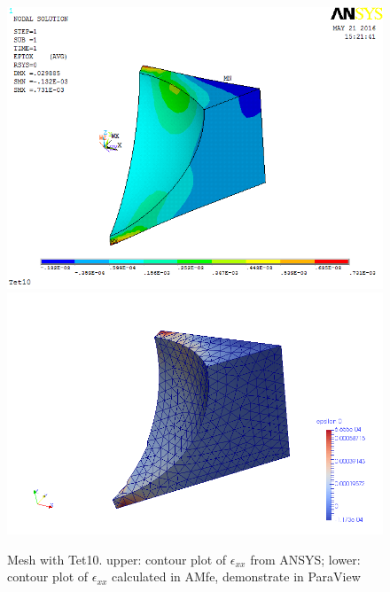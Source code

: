 \begin{figure}[htbp]
	\begin{center}
		\includegraphics[width=13cm,clip]{Tet10_Exx.png} 		
		\includegraphics[width=13cm,clip]{Tet10_Exx_P.png} 		
		\caption{Mesh with Tet10. upper: contour plot of $\epsilon_{xx}$ from ANSYS; lower: contour plot of $\epsilon_{xx}$ calculated in AMfe, demonstrate in ParaView} \label{fig: Tet10_Exx}
	\end{center}
\end{figure}

